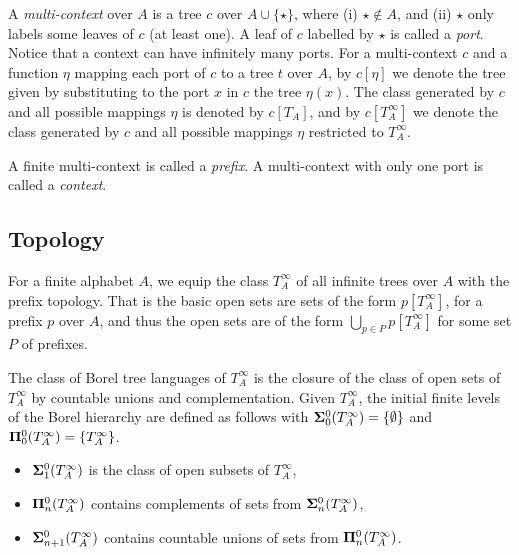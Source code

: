 \documentclass{llncs}
\begin{document}
A \emph{multi-context} over $A$ is a tree $c$ over $A \cup \{\star\}$, where (i) $\star \notin A$, and (ii) $\star$ only labels some leaves of $c$ (at least one). A leaf of $c$ labelled by $\star$ is called a \emph{port}. Notice that a context can have infinitely many ports. For a multi-context $c$ and a function $\eta$ mapping each port of $c$ to a tree $t$ over $A$, by $c[\eta]$ we denote the tree given by substituting to the port $x$ in $c$ the tree $\eta(x)$. The class generated by $c$ and all possible mappings $\eta$ is denoted by $c[T_A]$, and by $c[T^\infty_A]$ we denote the class generated by $c$ and all possible mappings $\eta$ restricted to $T_A^\infty$. 

A finite multi-context is called a \emph{prefix}.
A multi-context with only one port is called a \emph{context}. %

\subsection{Topology}
For a finite alphabet $A$, we equip the class $T^\infty_A$ of all infinite trees over $A$ with the prefix topology. That is the basic open sets are sets of the form $p[T^\infty_A]$, for a prefix $p$ over $A$, and thus the open sets are of the form $\bigcup_{p \in P}p[T^\infty_A]$ for some set $P$ of prefixes. 

The class of Borel tree languages of $T^\infty_A$ is the
closure of the class of open sets of $T^\infty_A$ by countable unions and
complementation. Given $T^\infty_A$, the initial finite levels of the
Borel hierarchy are defined as follows with ${\bf\Sigma}^0_0(T^\infty_A)= \{\emptyset\}$ and
${\bf\Pi}^0_0(T^\infty_A)=\{T^\infty_A \}$.
\begin{itemize}
\item ${\bf\Sigma}^0_1(T^\infty_A)$ is the class of open subsets of $T^\infty_A$, 
\item ${\bf\Pi}^0_n(T^\infty_A)$ contains complements of sets from ${\bf\Sigma}^0_n(T^\infty_A)$, 
\item ${\bf\Sigma}^0_{n+1}(T^\infty_A)$ contains countable unions of sets from ${\bf\Pi}^0_n(T^\infty_A)$. 
\end{itemize}

\end{document}

